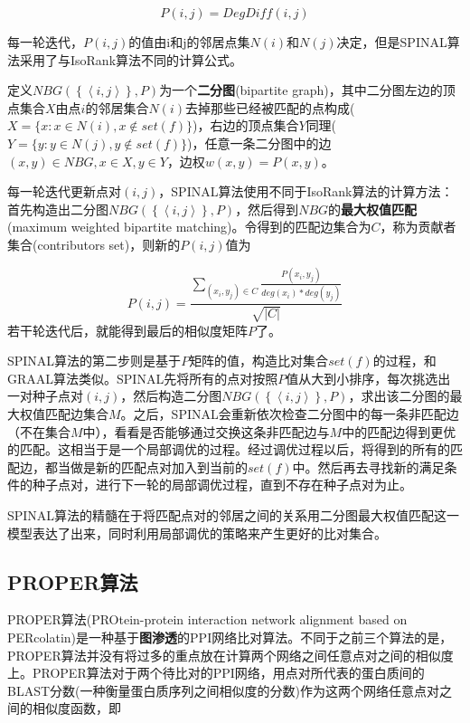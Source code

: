\begin{equation}\label{spinal1}
P(i,j)=DegDiff(i,j)
\end{equation}

每一轮迭代，$P(i,j)$的值由i和j的邻居点集$N(i)$和$N(j)$决定，但是SPINAL算法采用了与IsoRank算法不同的计算公式。

定义$NBG(\left \{ \left \langle i,j \right \rangle \right \},P)$为一个\textbf{二分图}(bipartite graph)，其中二分图左边的顶点集合$X$由点$i$的邻居集合$N(i)$去掉那些已经被匹配的点构成($X=\{x:x\in N(i),x\notin set(f)\}$)，右边的顶点集合$Y$同理($Y=\{y:y\in N(j),y\notin set(f)\}$)，任意一条二分图中的边$(x,y)\in NBG,x\in X,y\in Y$，边权$w(x,y)=P(x,y)$。

每一轮迭代更新点对$(i,j)$，SPINAL算法使用不同于IsoRank算法的计算方法：首先构造出二分图$NBG(\left \{ \left \langle i,j \right \rangle \right \},P)$，然后得到$NBG$的\textbf{最大权值匹配}(maximum weighted bipartite matching)。令得到的匹配边集合为$C$，称为贡献者集合(contributors set)，则新的$P(i,j)$值为

\begin{equation}\label{spinal2}
P(i,j)=\frac{\sum_{(x_i,y_j)\in C}\frac{P(x_i,y_j)}{deg(x_i)*deg(y_j)}}{\sqrt{\left | C \right |}}
\end{equation}
若干轮迭代后，就能得到最后的相似度矩阵$P$了。

SPINAL算法的第二步则是基于$P$矩阵的值，构造比对集合$set(f)$的过程，和GRAAL算法类似。SPINAL先将所有的点对按照$P$值从大到小排序，每次挑选出一对种子点对$(i,j)$，然后构造二分图$NBG(\left \{ \left \langle i,j \right \rangle \right \},P)$，求出该二分图的最大权值匹配边集合$M$。之后，SPINAL会重新依次检查二分图中的每一条非匹配边（不在集合$M$中），看看是否能够通过交换这条非匹配边与$M$中的匹配边得到更优的匹配。这相当于是一个局部调优的过程。经过调优过程以后，将得到的所有的匹配边，都当做是新的匹配点对加入到当前的$set(f)$中。然后再去寻找新的满足条件的种子点对，进行下一轮的局部调优过程，直到不存在种子点对为止。

SPINAL算法的精髓在于将匹配点对的邻居之间的关系用二分图最大权值匹配这一模型表达了出来，同时利用局部调优的策略来产生更好的比对集合。
\subsection{PROPER算法}
PROPER算法(PROtein-protein interaction network alignment based on PERcolatin)\cite{kazemi2016proper}是一种基于\textbf{图渗透}的PPI网络比对算法。不同于之前三个算法的是，PROPER算法并没有将过多的重点放在计算两个网络之间任意点对之间的相似度上。PROPER算法对于两个待比对的PPI网络，用点对所代表的蛋白质间的BLAST分数\cite{altschul1990basic}(一种衡量蛋白质序列之间相似度的分数)作为这两个网络任意点对之间的相似度函数，即


